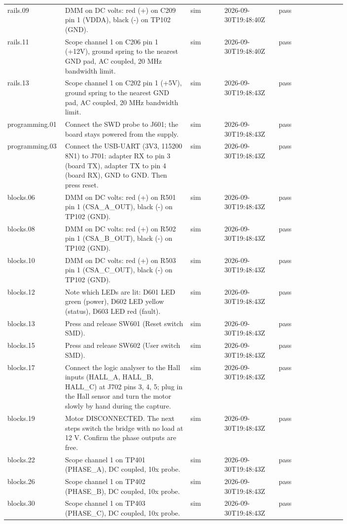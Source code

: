 \documentclass[11pt]{article}
\begin{document}
{\begin{longtable}{p{0.17\linewidth}p{0.37\linewidth}p{0.1\linewidth}p{0.16\linewidth}l}
\mbox{rails.09} & DMM on DC volts: red (+) on C209 pin 1 (VDDA), black (-) on TP102 (GND). & sim & 2026-09-30T19:48:40Z & pass \\
\mbox{rails.11} & Scope channel 1 on C206 pin 1 (+12V), ground spring to the nearest GND pad, AC coupled, 20 MHz bandwidth limit. & sim & 2026-09-30T19:48:40Z & pass \\
\mbox{rails.13} & Scope channel 1 on C202 pin 1 (+5V), ground spring to the nearest GND pad, AC coupled, 20 MHz bandwidth limit. & sim & 2026-09-30T19:48:43Z & pass \\
\mbox{programming.01} & Connect the SWD probe to J601; the board stays powered from the supply. & sim & 2026-09-30T19:48:43Z & pass \\
\mbox{programming.03} & Connect the USB-UART (3V3, 115200 8N1) to J701: adapter RX to pin 3 (board TX), adapter TX to pin 4 (board RX), GND to GND. Then press reset. & sim & 2026-09-30T19:48:43Z & pass \\
\mbox{blocks.06} & DMM on DC volts: red (+) on R501 pin 1 (CSA\_A\_OUT), black (-) on TP102 (GND). & sim & 2026-09-30T19:48:43Z & pass \\
\mbox{blocks.08} & DMM on DC volts: red (+) on R502 pin 1 (CSA\_B\_OUT), black (-) on TP102 (GND). & sim & 2026-09-30T19:48:43Z & pass \\
\mbox{blocks.10} & DMM on DC volts: red (+) on R503 pin 1 (CSA\_C\_OUT), black (-) on TP102 (GND). & sim & 2026-09-30T19:48:43Z & pass \\
\mbox{blocks.12} & Note which LEDs are lit: D601 LED green (power), D602 LED yellow (status), D603 LED red (fault). & sim & 2026-09-30T19:48:43Z & pass \\
\mbox{blocks.13} & Press and release SW601 (Reset switch SMD). & sim & 2026-09-30T19:48:43Z & pass \\
\mbox{blocks.15} & Press and release SW602 (User switch SMD). & sim & 2026-09-30T19:48:43Z & pass \\
\mbox{blocks.17} & Connect the logic analyser to the Hall inputs (HALL\_A, HALL\_B, HALL\_C) at J702 pins 3, 4, 5; plug in the Hall sensor and turn the motor slowly by hand during the capture. & sim & 2026-09-30T19:48:43Z & pass \\
\mbox{blocks.19} & Motor DISCONNECTED. The next steps switch the bridge with no load at 12 V. Confirm the phase outputs are free. & sim & 2026-09-30T19:48:43Z & pass \\
\mbox{blocks.22} & Scope channel 1 on TP401 (PHASE\_A), DC coupled, 10x probe. & sim & 2026-09-30T19:48:43Z & pass \\
\mbox{blocks.26} & Scope channel 1 on TP402 (PHASE\_B), DC coupled, 10x probe. & sim & 2026-09-30T19:48:43Z & pass \\
\mbox{blocks.30} & Scope channel 1 on TP403 (PHASE\_C), DC coupled, 10x probe. & sim & 2026-09-30T19:48:43Z & pass \\
\hline
\end{longtable}
}
\end{document}
